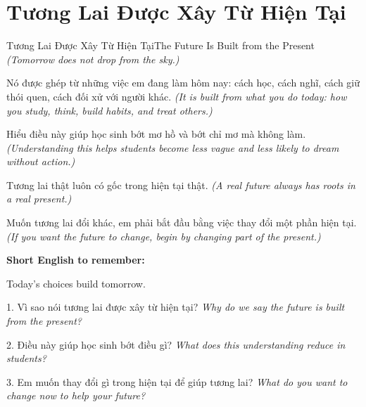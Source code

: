 \section{Tương Lai Được Xây Từ Hiện Tại}
\begin{truyen}{Tương Lai Được Xây Từ Hiện Tại}{The Future Is Built from the Present}
\textit{(Tomorrow does not drop from the sky.)}

Nó được ghép từ những việc em đang làm hôm nay: cách học, cách nghĩ, cách giữ thói quen, cách đối xử với người khác.
\textit{(It is built from what you do today: how you study, think, build habits, and treat others.)}

Hiểu điều này giúp học sinh bớt mơ hồ và bớt chỉ mơ mà không làm.
\textit{(Understanding this helps students become less vague and less likely to dream without action.)}

Tương lai thật luôn có gốc trong hiện tại thật.
\textit{(A real future always has roots in a real present.)}
\end{truyen}

\begin{baihoc}
Muốn tương lai đổi khác, em phải bắt đầu bằng việc thay đổi một phần hiện tại.
\textit{(If you want the future to change, begin by changing part of the present.)}
\end{baihoc}

\begin{ghinhoanh}
\textbf{Short English to remember:}

Today's choices build tomorrow.

\end{ghinhoanh}

\begin{tuhocnhanh}
1. Vì sao nói tương lai được xây từ hiện tại? \textit{Why do we say the future is built from the present?}

2. Điều này giúp học sinh bớt điều gì? \textit{What does this understanding reduce in students?}

3. Em muốn thay đổi gì trong hiện tại để giúp tương lai? \textit{What do you want to change now to help your future?}
\end{tuhocnhanh}
\ngancach

